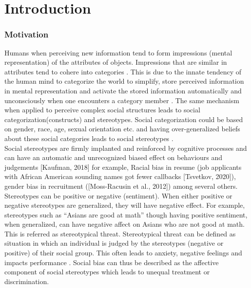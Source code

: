 \chapter{Introduction}
\subsection{Motivation}

Humans when perceiving new information tend to form impressions (mental representation) of the attributes of objects. Impressions that are similar in attributes tend to cohere into categories \cite{fiske1998stereotyping}\cite{allport1954nature}. This is due to the innate tendency of the human mind to categorize the world to simplify, store perceived information in mental representation and activate the stored information automatically and unconsciously when one encounters
a category member \cite{ComputationalEthics}. The same mechanism when applied to perceive complex social structures leads to social categorization(constructs) and stereotypes. Social categorization could be based on gender, race, age, sexual orientation etc. and having over-generalized beliefs about these social categories leads to social stereotypes \cite{beukeboom2019stereotypes}\cite{ComputationalEthics}.	
\\

Social stereotypes are firmly implanted and reinforced by cognitive processes and can have
an automatic and unrecognized biased effect on behaviours and judgements [Kaufman, 2018]
for example, Racial bias in resume (job applicants with African American sounding names
got fewer callbacks [Tsvetkov, 2020]), gender bias in recruitment ([Moss-Racusin et al., 2012])
among several others. Stereotypes can be positive or negative (sentiment). When either positive or negative stereotypes are generalized, they will have negative effect. For example, stereotypes such as “Asians are good at math” though having positive sentiment, when generalized, can have negative affect on Asians who are not good at math. This is referred as stereotypical threat. Stereotypical threat can be defined as situation in which an individual is judged by the stereotypes (negative or positive) of their social group. This often leads to anxiety, negative feelings and impacts performance \cite{beukeboom2019stereotypes}\cite{spencer2016stereotype}. Social
bias can thus be described as the affective component of social stereotypes which leads to unequal treatment or
discrimination.
\\

